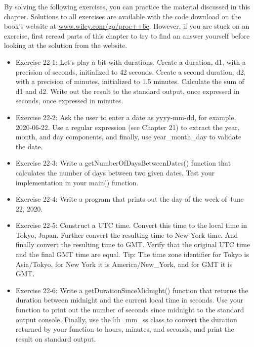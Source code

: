 By solving the following exercises, you can practice the material discussed in this chapter. Solutions to all exercises are available with the code download on the book’s website at \url{www.wiley.com/go/proc++6e}. However, if you are stuck on an exercise, first reread parts of this chapter to try to find an answer yourself before looking at the solution from the website.

\begin{itemize}
\item
Exercise 22-1: Let’s play a bit with durations. Create a duration, d1, with a precision of seconds, initialized to 42 seconds. Create a second duration, d2, with a precision of minutes, initialized to 1.5 minutes. Calculate the sum of d1 and d2. Write out the result to the standard output, once expressed in seconds, once expressed in minutes.

\item
Exercise 22-2: Ask the user to enter a date as yyyy-mm-dd, for example, 2020-06-22. Use a regular expression (see Chapter 21) to extract the year, month, and day components, and finally, use year\_month\_day to validate the date.

\item
Exercise 22-3: Write a getNumberOfDaysBetweenDates() function that calculates the number of days between two given dates. Test your implementation in your main() function.

\item
Exercise 22-4: Write a program that prints out the day of the week of June 22, 2020.

\item
Exercise 22-5: Construct a UTC time. Convert this time to the local time in Tokyo, Japan. Further convert the resulting time to New York time. And finally convert the resulting time to GMT. Verify that the original UTC time and the final GMT time are equal. Tip: The time zone identifier for Tokyo is Asia/Tokyo, for New York it is America/New\_York, and for GMT it is GMT.

\item
Exercise 22-6: Write a getDurationSinceMidnight() function that returns the duration between midnight and the current local time in seconds. Use your function to print out the number of seconds since midnight to the standard output console. Finally, use the hh\_mm\_ss class to convert the duration returned by your function to hours, minutes, and seconds, and print the result on standard output.
\end{itemize}












